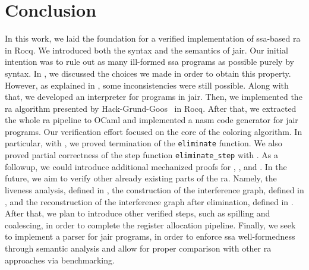 
\chapter{Conclusion}
\label{cha:conclusion}

In this work, we laid the foundation for a verified implementation of \gls{ssa}-based \gls{ra} in Rocq. We introduced both the syntax and the semantics of \gls{jair}. Our initial intention was to rule out as many ill-formed \gls{ssa} programs as possible purely by syntax. In , we discussed the choices we made in order to obtain this property. However, as explained in , some inconsistencies were still possible. Along with that, we developed an interpreter for programs in \gls{jair}. Then, we implemented the \gls{ra} algorithm presented by Hack-Grund-Goos~\cite{HGG:2006:RA-SSA} in Rocq. After that, we extracted the whole \gls{ra} pipeline to OCaml and implemented a \gls{nasm} code generator for \gls{jair} programs.
Our verification effort focused on the core of the coloring algorithm. In particular, with , we proved termination of the \texttt{eliminate} function. We also proved partial correctness of the step function \texttt{eliminate\_step} with . As a followup, we could introduce additional mechanized proofs for , , and . In the future, we aim to verify other already existing parts of the \gls{ra}. Namely, the liveness analysis, defined in , the construction of the interference graph, defined in , and the reconstruction of the interference graph after elimination, defined in . After that, we plan to introduce other verified steps, such as spilling and coalescing, in order to complete the register allocation pipeline. Finally, we seek to implement a parser for \gls{jair} programs, in order to enforce \gls{ssa} well-formedness through semantic analysis and allow for proper comparison with other \gls{ra} approaches via benchmarking.